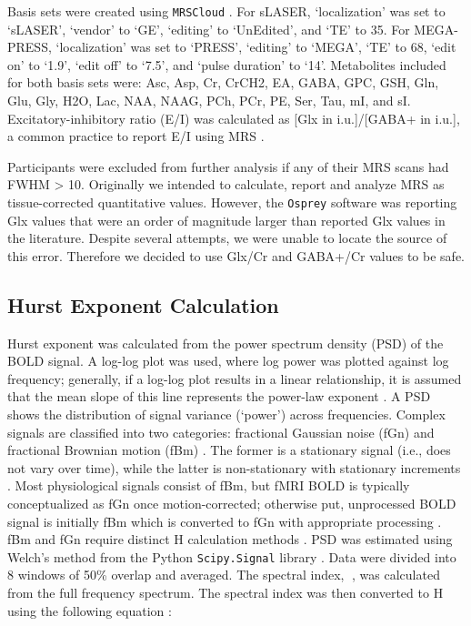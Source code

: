 \documentclass[
true
]{sn-jnl}
\begin{document}
Basis sets were created using \texttt{MRSCloud}
\citep{huiMRSCloudCloudbasedMRS2022, moriMRICloudDeliveringHighThroughput2016}.
For sLASER, `localization' was set to `sLASER', `vendor' to `GE',
`editing' to `UnEdited', and `TE' to 35. For MEGA-PRESS, `localization'
was set to `PRESS', `editing' to `MEGA', `TE' to 68, `edit on' to `1.9',
`edit off' to `7.5', and `pulse duration' to `14'. Metabolites included
for both basis sets were: Asc, Asp, Cr, CrCH2, EA, GABA, GPC, GSH, Gln,
Glu, Gly, H2O, Lac, NAA, NAAG, PCh, PCr, PE, Ser, Tau, mI, and sI.
Excitatory-inhibitory ratio (E/I) was calculated as {[}Glx in
i.u.{]}/{[}GABA+ in i.u.{]}, a common practice to report E/I using MRS
\citep{rideauxNoBalanceGlutamate+glutamine2021}.

Participants were excluded from further analysis if any of their MRS
scans had FWHM \textgreater{} 10. Originally we intended to calculate,
report and analyze MRS as tissue-corrected quantitative values. However,
the \texttt{Osprey} software was reporting Glx values that were an order
of magnitude larger than reported Glx values in the literature. Despite
several attempts, we were unable to locate the source of this error.
Therefore we decided to use Glx/Cr and GABA+/Cr values to be safe.

\subsection{Hurst Exponent
Calculation}\label{hurst-exponent-calculation}

Hurst exponent was calculated from the power spectrum density (PSD) of
the BOLD signal. A log-log plot was used, where log power was plotted
against log frequency; generally, if a log-log plot results in a linear
relationship, it is assumed that the mean slope of this line represents
the power-law exponent \citep{zimmernWhyBrainCriticality2020}. A PSD
shows the distribution of signal variance (`power') across frequencies.
Complex signals are classified into two categories: fractional Gaussian
noise (fGn) and fractional Brownian motion (fBm)
\citep{duffPowerSpectralDensity2008, ekeFractalCharacterizationComplexity2002}.
The former is a stationary signal (i.e., does not vary over time), while
the latter is non-stationary with stationary increments
\citep{ekeFractalCharacterizationComplexity2002}. Most physiological
signals consist of fBm, but fMRI BOLD is typically conceptualized as fGn
once motion-corrected; otherwise put, unprocessed BOLD signal is
initially fBm which is converted to fGn with appropriate processing
\citep{bullmoreWaveletsFunctionalMagnetic2004}. fBm and fGn require
distinct H calculation methods
\citep{ekeFractalCharacterizationComplexity2002}. PSD was estimated
using Welch's method \citep{welchUseFastFourier1967} from the Python
\texttt{Scipy.Signal} library \citep{virtanenSciPy10Fundamental2020}.
Data were divided into 8 windows of 50\% overlap and averaged. The
spectral index, , was calculated from the full frequency spectrum. The
spectral index was then converted to H using the following equation
\citep{ekeFractalCharacterizationComplexity2002, schaeferComparativeAnalysisSpectral2014}:
\end{document}
